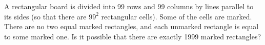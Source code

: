 \problem
A rectangular board is divided into 99 rows and 99 columns by lines parallel to
its sides (so that there are $99 ^ 2$ rectangular cells).
Some of the cells are marked.
There are no two equal marked rectangles, and each unmarked rectangle is equal
to some marked one.
Is it possible that there are exactly 1999 marked rectangles?
\solution
\endproblem
